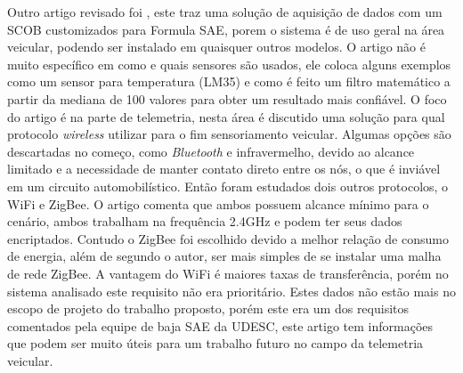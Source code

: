 Outro artigo revisado foi \cite{vehicleDataAcquisition2014}, este traz uma solução de aquisição de dados com um SCOB customizados para Formula SAE, porem o sistema é de uso geral na área veicular, podendo ser instalado em quaisquer outros modelos. O artigo não é muito específico em como e quais sensores são usados, ele coloca alguns exemplos como um sensor para temperatura (LM35) e como é feito um filtro matemático a partir da mediana de 100 valores para obter um resultado mais confiável. O foco do artigo é na parte de telemetria, nesta área é discutido uma solução para qual protocolo \textit{wireless} utilizar para o fim sensoriamento veicular. Algumas opções são descartadas no começo, como \textit{Bluetooth} e infravermelho, devido ao alcance limitado e a necessidade de manter contato direto entre os nós, o que é inviável em um circuito automobilístico. Então foram estudados dois outros protocolos, o WiFi e ZigBee. O artigo comenta que ambos possuem alcance mínimo para o cenário, ambos trabalham na frequência 2.4GHz e podem ter seus dados encriptados. Contudo o ZigBee foi escolhido devido a melhor relação de consumo de energia, além de segundo o autor, ser mais simples de se instalar uma malha de rede ZigBee. A vantagem do WiFi é maiores taxas de transferência, porém no sistema analisado este requisito não era prioritário. Estes dados não estão mais no escopo de projeto do trabalho proposto, porém este era um dos requisitos comentados pela equipe de baja SAE da UDESC, este artigo tem informações que podem ser muito úteis para um trabalho futuro no campo da telemetria veicular.         


